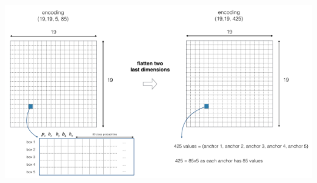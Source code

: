 \documentclass[11pt, a4paper]{article}
\begin{document}
\begin{spacing}{1.1}
	\begin{center}	\includegraphics[scale=.8]{flat_encode} \end{center} \newpage


\end{spacing}
\end{document}
